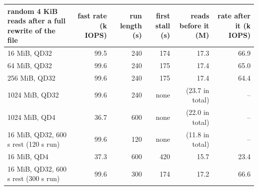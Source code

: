 \begin{tabular}{lrrrrr}
\toprule
random 4 KiB reads after a full rewrite of the file & fast rate (k IOPS) & run length (s) & first stall (s) & reads before it (M) & rate after it (k IOPS) \\
\midrule
16 MiB, QD32 & 99.5 & 240 & 174 & 17.3 & 66.9 \\
64 MiB, QD32 & 99.6 & 240 & 175 & 17.4 & 65.0 \\
256 MiB, QD32 & 99.6 & 240 & 175 & 17.4 & 64.4 \\
1024 MiB, QD32 & 99.6 & 240 & none & (23.7 in total) & -- \\
1024 MiB, QD4 & 36.7 & 600 & none & (22.0 in total) & -- \\
16 MiB, QD32, 600 s rest (120 s run) & 99.6 & 120 & none & (11.8 in total) & -- \\
16 MiB, QD4 & 37.3 & 600 & 420 & 15.7 & 23.4 \\
16 MiB, QD32, 600 s rest (300 s run) & 99.6 & 300 & 174 & 17.2 & 66.6 \\
\bottomrule
\end{tabular}
